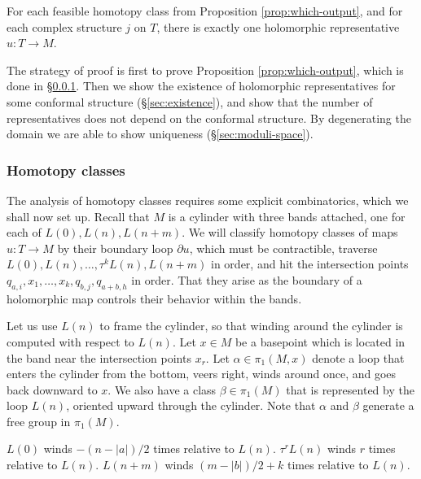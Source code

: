 \documentclass[12pt]{amsart}
\begin{document}
\begin{proposition}
\label{prop:polygon-count}
For each feasible homotopy class from Proposition
\ref{prop:which-output}, and for each complex structure $j$ on $T$,
there is exactly one holomorphic representative $u: T \to M$.
\end{proposition}

The strategy of proof is first to prove Proposition
\ref{prop:which-output}, which is done in \S\ref{sec:homotopy-classes}. Then we show the existence of holomorphic
representatives for some conformal structure (\S\ref{sec:existence}), and show that the
number of representatives does not depend on the conformal
structure. By degenerating the domain we are able to show uniqueness (\S\ref{sec:moduli-space}).

\subsubsection{Homotopy classes}
\label{sec:homotopy-classes}

The analysis of homotopy classes requires some explicit combinatorics,
which we shall now set up. Recall that $M$ is a cylinder with three
bands attached, one for each of $L(0),L(n),L(n+m)$. We will classify
homotopy classes of maps $u: T\to M$ by their boundary loop $\partial
u$, which must be contractible, traverse
$L(0),L(n),\dots,\tau^kL(n),L(n+m)$ in order, and hit the intersection
points $q_{a,i},x_1,\dots,x_k,q_{b,j},q_{a+b,h}$ in order. That they
arise as the boundary of a holomorphic map controls their behavior
within the bands.

Let us use $L(n)$ to frame the cylinder, so that winding around the
cylinder is computed with respect to $L(n)$. Let $x \in M$ be a
basepoint which is located in the band near the intersection points
$x_r$. Let $\alpha \in \pi_1(M,x)$ denote a loop that enters the
cylinder from the bottom, veers right, winds around once, and goes
back downward to $x$. We also have a class $\beta \in \pi_1(M)$ that is
represented by the loop $L(n)$, oriented upward through the
cylinder. Note that $\alpha$ and $\beta$ generate a free group in
$\pi_1(M)$.

\begin{lemma}
  $L(0)$ winds $-(n-|a|)/2$ times relative to $L(n)$. $\tau^r L(n)$ winds $r$ times relative to $L(n)$. $L(n+m)$ winds $(m-|b|)/2 + k$ times relative to $L(n)$.
\end{lemma}
\end{document}
